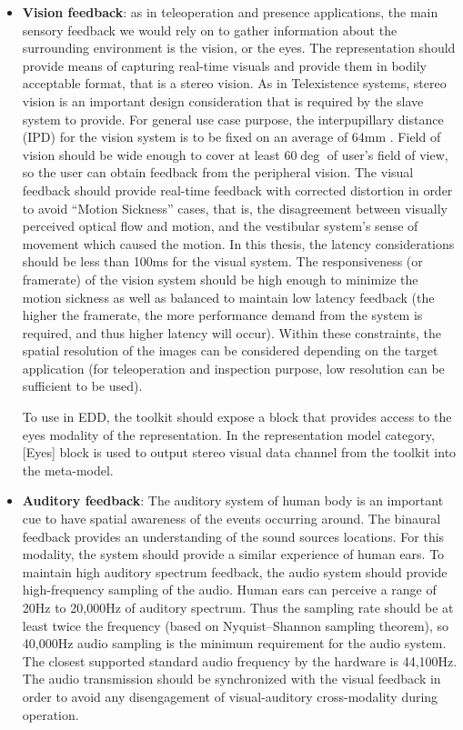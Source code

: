 \begin{itemize}
\item \textbf{Vision feedback}: as in teleoperation and presence applications, the main sensory feedback we would rely on to gather information about the surrounding environment is the vision, or the eyes. The representation should provide means of capturing real-time visuals and provide them in bodily acceptable format, that is a stereo vision. As in Telexistence systems, stereo vision is an important design consideration that is required by the slave system to provide. For general use case purpose, the interpupillary distance (IPD) for the vision system is to be fixed on an average of 64mm \cite{dodgson2004variation}. Field of vision should be wide enough to cover at least $60\deg$ of user's field of view, so the user can obtain feedback from the peripheral vision. The visual feedback should provide real-time feedback with corrected distortion in order to avoid ``Motion Sickness'' cases, that is, the disagreement between visually perceived optical flow and motion, and the vestibular system's sense of movement which caused the motion. In this thesis, the latency considerations should be less than 100ms for the visual system. The responsiveness (or framerate) of the vision system should be high enough to minimize the motion sickness as well as balanced to maintain low latency feedback (the higher the framerate, the more performance demand from the system is required, and thus higher latency will occur). Within these constraints, the spatial resolution of the images can be considered depending on the target application (for teleoperation and inspection purpose, low resolution can be sufficient to be used).

To use in EDD, the toolkit should expose a block that provides access to the eyes modality of the representation. In the representation model category, [Eyes] block is used to output stereo visual data channel from the toolkit into the meta-model.

\item \textbf{Auditory feedback}: The auditory system of human body is an important cue to have spatial awareness of the events occurring around. The binaural feedback provides an understanding of the sound sources locations. For this modality, the system should provide a similar experience of human ears. To maintain high auditory spectrum feedback, the audio system should provide high-frequency sampling of the audio. Human ears can perceive a range of 20Hz to 20,000Hz of auditory spectrum. Thus the sampling rate should be at least twice the frequency (based on Nyquist–Shannon sampling theorem), so 40,000Hz audio sampling is the minimum requirement for the audio system. The closest supported standard audio frequency by the hardware is 44,100Hz. The audio transmission should be synchronized with the visual feedback in order to avoid any disengagement of visual-auditory cross-modality during operation. 


\end{itemize}
